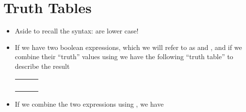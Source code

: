 \documentclass[letterpaper,10pt,english]{sphinxmanual}
\begin{document}
\section{Truth Tables}
\label{\detokenize{lecture_notes/lec11_conditionals2:truth-tables}}\begin{itemize}
\item {} 
Aside to recall the syntax:  are lower case!

\item {} 
If we have two boolean expressions, which we will refer to as 
and , and if we combine their “truth” values using  we
have the following “truth table” to describe the result


\begin{savenotes}\sphinxattablestart
\centering
\begin{tabulary}{\linewidth}[t]{|T|T|T|}
\hline
\sphinxstyletheadfamily 
{}
&\sphinxstyletheadfamily 
{}
&\sphinxstyletheadfamily 
{}
\\
\hline
{}
&
&
\\
\hline
{}
&
&
\\
\hline
{}
&
&
\\
\hline
{}
&
&
\\
\hline
\end{tabulary}
\par
\sphinxattableend\end{savenotes}

\item {} 
If we combine the two expressions using , we have



\end{itemize}
\end{document}
